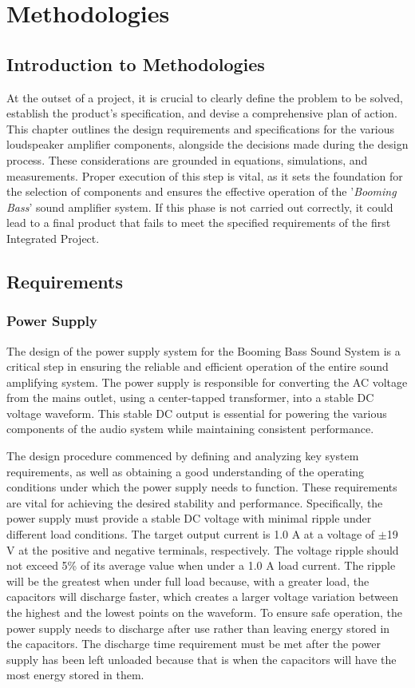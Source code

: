 \chapter{Methodologies}
\label{chapter:methodologies}
\section{Introduction to Methodologies}
At the outset of a project, it is crucial to clearly define the problem to be solved, establish the product's specification, and devise a comprehensive plan of action. This chapter outlines the design requirements and specifications for the various loudspeaker amplifier components, alongside the decisions made during the design process. These considerations are grounded in equations, simulations, and measurements. Proper execution of this step is vital, as it sets the foundation for the selection of components and ensures the effective operation of the '\emph{Booming Bass}' sound amplifier system. If this phase is not carried out correctly, it could lead to a final product that fails to meet the specified requirements of the first Integrated Project.

\section{Requirements}
\subsection{Power Supply}
The design of the power supply system for the Booming Bass Sound System is a critical step in ensuring the reliable and efficient operation of the entire sound amplifying system. The power supply is responsible for converting the AC voltage from the mains outlet, using a center-tapped transformer, into a stable DC voltage waveform. This stable DC output is essential for powering the various components of the audio system while maintaining consistent performance.

The design procedure commenced by defining and analyzing key system requirements, as well as obtaining a good understanding of the operating conditions under which the power supply needs to function. These requirements are vital for achieving the desired stability and performance. Specifically, the power supply must provide a stable DC voltage with minimal ripple under different load conditions. The target output current is 1.0 A at a voltage of $\pm$19 V at the positive and negative terminals, respectively. The voltage ripple should not exceed 5\% of its average value when under a 1.0 A load current. The ripple will be the greatest when under full load because, with a greater load, the capacitors will discharge faster, which creates a larger voltage variation between the highest and the lowest points on the waveform. To ensure safe operation, the power supply needs to discharge after use rather than leaving energy stored in the capacitors. The discharge time requirement must be met after the power supply has been left unloaded because that is when the capacitors will have the most energy stored in them.

